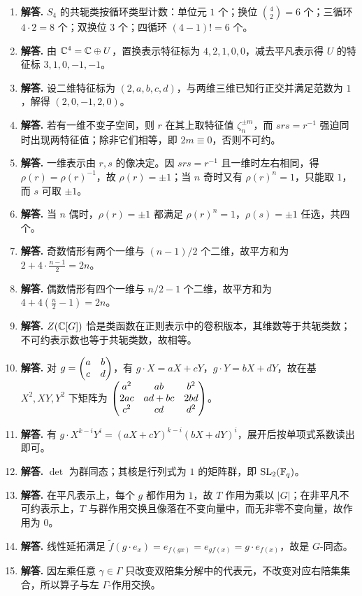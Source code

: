 \begin{enumerate}[label=\textbf{\arabic*.}, leftmargin=*, itemsep=1em]
\item \textbf{解答.} $S_4$ 的共轭类按循环类型计数：单位元 $1$ 个；换位 $\binom42=6$ 个；三循环 $4\cdot2=8$ 个；双换位 $3$ 个；四循环 $(4-1)!=6$ 个。
\item \textbf{解答.} 由 $\mathbb{C}^4=\mathbb{C}\oplus U$，置换表示特征标为 $4,2,1,0,0$，减去平凡表示得 $U$ 的特征标 $3,1,0,-1,-1$。
\item \textbf{解答.} 设二维特征标为 $(2,a,b,c,d)$，与两维三维已知行正交并满足范数为 $1$，解得 $(2,0,-1,2,0)$。
\item \textbf{解答.} 若有一维不变子空间，则 $r$ 在其上取特征值 $\zeta_n^{\pm m}$，而 $srs=r^{-1}$ 强迫同时出现两特征值；除非它们相等，即 $2m\equiv0$，否则不可约。
\item \textbf{解答.} 一维表示由 $r,s$ 的像决定。因 $srs=r^{-1}$ 且一维时左右相同，得 $\rho(r)=\rho(r)^{-1}$，故 $\rho(r)=\pm1$；当 $n$ 奇时又有 $\rho(r)^n=1$，只能取 $1$，而 $s$ 可取 $\pm1$。
\item \textbf{解答.} 当 $n$ 偶时，$\rho(r)=\pm1$ 都满足 $\rho(r)^n=1$，$\rho(s)=\pm1$ 任选，共四个。
\item \textbf{解答.} 奇数情形有两个一维与 $(n-1)/2$ 个二维，故平方和为 $2+4\cdot\frac{n-1}2=2n$。
\item \textbf{解答.} 偶数情形有四个一维与 $n/2-1$ 个二维，故平方和为 $4+4(\frac n2-1)=2n$。
\item \textbf{解答.} $Z(\mathbb{C}[G])$ 恰是类函数在正则表示中的卷积版本，其维数等于共轭类数；不可约表示数也等于共轭类数，故相等。
\item \textbf{解答.} 对 $g=\begin{pmatrix} a&b\\c&d \end{pmatrix}$，有 $g\cdot X=aX+cY$，$g\cdot Y=bX+dY$，故在基 $X^2,XY,Y^2$ 下矩阵为 $\begin{pmatrix} a^2&ab&b^2\\2ac&ad+bc&2bd\\ c^2&cd&d^2 \end{pmatrix}$。
\item \textbf{解答.} 有 $g\cdot X^{k-i}Y^i=(aX+cY)^{k-i}(bX+dY)^i$，展开后按单项式系数读出即可。
\item \textbf{解答.} $\det$ 为群同态；其核是行列式为 $1$ 的矩阵群，即 $\mathrm{SL}_2(\mathbb{F}_q)$。
\item \textbf{解答.} 在平凡表示上，每个 $g$ 都作用为 $1$，故 $T$ 作用为乘以 $|G|$；在非平凡不可约表示上，$T$ 与群作用交换且像落在不变向量中，而无非零不变向量，故作用为 $0$。
\item \textbf{解答.} 线性延拓满足 $\widetilde f(g\cdot e_x)=e_{f(gx)}=e_{gf(x)}=g\cdot e_{f(x)}$，故是 $G$-同态。
\item \textbf{解答.} 因左乘任意 $\gamma\in\Gamma$ 只改变双陪集分解中的代表元，不改变对应右陪集集合，所以算子与左 $\Gamma$-作用交换。

\end{enumerate}
